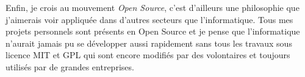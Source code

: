 Enfin, je crois au mouvement \textit{Open Source}, c'est d'ailleurs une philosophie que j'aimerais voir appliquée dans d'autres secteurs que l'informatique. Tous mes projets personnels sont présents en Open Source et je pense que l'informatique n'aurait jamais pu se développer aussi rapidement sans tous les travaux sous licence MIT et GPL qui sont encore modifiés par des volontaires et toujours utilisés par de grandes entreprises.

\conclusion{}

\makeletterclosing

